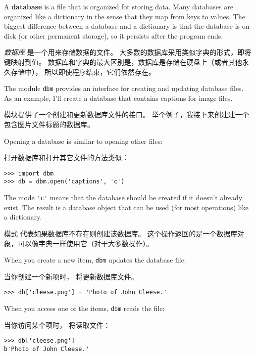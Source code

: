 {{{{{{{A {\bf database} is a file that is organized for storing data.  Many
databases are organized like a dictionary in the sense that they map
from keys to values.  The biggest difference between a database and a
dictionary is that the database is on disk (or other permanent
storage), so it persists after the program ends.  

{\em 数据库} 是一个用来存储数据的文件。
大多数的数据库采用类似字典的形式，即将键映射到值。
数据库和字典的最大区别是，数据库是存储在硬盘上（或者其他永久存储中），
所以即使程序结束，它们依然存在。

 

The module {\tt dbm} provides an interface for creating
and updating database files.
As an example, I'll create a database
that contains captions for image files.

 模块提供了一个创建和更新数据库文件的接口。
举个例子，我接下来创建建一个包含图片文件标题的数据库。

  

Opening a database is similar to opening other files:

打开数据库和打开其它文件的方法类似：

\begin{lstlisting}
>>> import dbm
>>> db = dbm.open('captions', 'c')
\end{lstlisting}
%
The mode \verb"'c'" means that the database should be created if
it doesn't already exist.  The result is a database object
that can be used (for most operations) like a dictionary.

模式  代表如果数据库不存在则创建该数据库。
这个操作返回的是一个数据库对象，可以像字典一样使用它（对于大多数操作）。

  

When you create a new item, {\tt dbm} updates the database file.

当你创建一个新项时， 将更新数据库文件。


\begin{lstlisting}
>>> db['cleese.png'] = 'Photo of John Cleese.'
\end{lstlisting}
%
When you access one of the items, {\tt dbm} reads the file:

当你访问某个项时， 将读取文件：

\begin{lstlisting}
>>> db['cleese.png']
b'Photo of John Cleese.'
\end{lstlisting}

}}}}}}}
